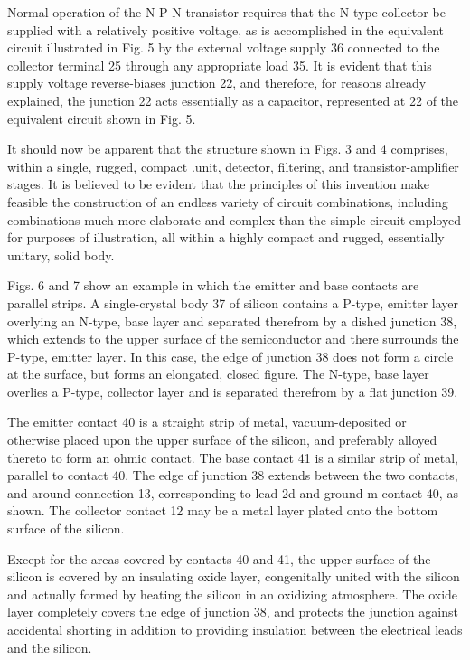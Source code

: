 Normal operation of the N-P-N transistor requires that the N-type collector be supplied with a relatively positive voltage, as is accomplished in the equivalent circuit illustrated in Fig. 5 by the external voltage supply 36 connected to the collector terminal 25 through any appropriate load 35. It is evident that this supply voltage reverse-biases junction 22, and therefore, for reasons already explained, the junction 22 acts essentially as a capacitor, represented at 22 of the equivalent circuit shown in Fig. 5.

It should now be apparent that the structure shown in Figs. 3 and 4 comprises, within a single, rugged, compact .unit, detector, filtering, and transistor-amplifier stages. It is believed to be evident that the principles of this invention make feasible the construction of an endless variety of circuit combinations, including combinations much more elaborate and complex than the simple circuit employed for purposes of illustration, all within a highly compact and rugged, essentially unitary, solid body.

Figs. 6 and 7 show an example in which the emitter and base contacts are parallel strips. A single-crystal body 37 of silicon contains a P-type, emitter layer overlying an N-type, base layer and separated therefrom by a dished junction 38, which extends to the upper surface of the semiconductor and there surrounds the P-type, emitter layer. In this case, the edge of junction 38 does not form a circle at the surface, but forms an elongated, closed figure. The N-type, base layer overlies a P-type, collector layer and is separated therefrom by a flat junction 39.

The emitter contact 40 is a straight strip of metal, vacuum-deposited or otherwise placed upon the upper surface of the silicon, and preferably alloyed thereto to form an ohmic contact. The base contact 41 is a similar strip of metal, parallel to contact 40. The edge of junction 38 extends between the two contacts, and around connection 13, corresponding to lead 2d and ground m contact 40, as shown. The collector contact 12 may be a metal layer plated onto the bottom surface of the silicon.

Except for the areas covered by contacts 40 and 41, the upper surface of the silicon is covered by an insulating oxide layer, congenitally united with the silicon and actually formed by heating the silicon in an oxidizing atmosphere. The oxide layer completely covers the edge of junction 38, and protects the junction against accidental shorting in addition to providing insulation between the electrical leads and the silicon.

